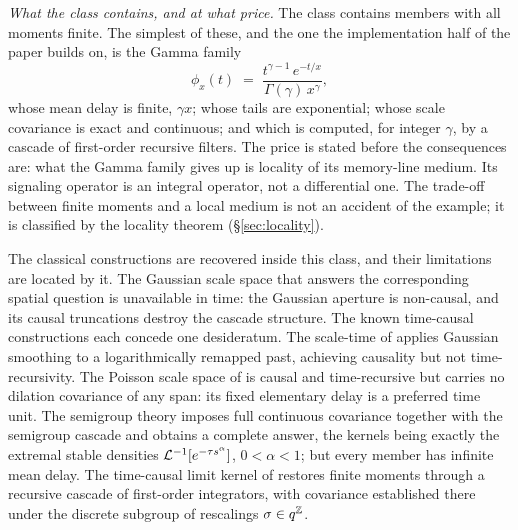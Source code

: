 \emph{What the class contains, and at what price.} The class contains members with all
moments finite. The simplest of these, and the one the implementation half of the paper
builds on, is the Gamma family
\[
  \phi_x(t) \;=\; \frac{t^{\gamma-1}\,e^{-t/x}}{\Gamma(\gamma)\,x^{\gamma}},
\]
whose mean delay is finite, $\gamma x$; whose tails are exponential; whose scale covariance
is exact and continuous; and which is computed, for integer $\gamma$, by a cascade of
first-order recursive filters. The price is stated before the consequences are: what the
Gamma family gives up is locality of its memory-line medium. Its signaling operator is
an integral operator, not a differential one. The trade-off between finite moments
and a local medium is not an accident of the example; it is classified by the locality
theorem (\S\ref{sec:locality}).

The classical constructions are recovered inside this class, and their limitations are
located by it. The Gaussian scale space that answers the corresponding spatial question
 is unavailable in time: the Gaussian
aperture is non-causal, and its causal truncations destroy the cascade structure. The
known time-causal constructions each concede one desideratum. The scale-time of
 applies Gaussian smoothing to a logarithmically remapped past,
achieving causality but not time-recursivity. The Poisson scale space of
 is causal and time-recursive but carries no dilation covariance
of any span: its fixed elementary delay is a preferred time unit. The semigroup theory
imposes full
continuous covariance together with the semigroup cascade and obtains a complete answer,
the kernels being exactly the extremal stable densities $\mathcal{L}^{-1}[e^{-\tau s^\alpha}]$,
$0 < \alpha < 1$; but every member has infinite mean delay. The time-causal limit kernel of
 restores
finite moments through a recursive cascade of first-order integrators, with covariance
established there under the discrete subgroup of rescalings $\sigma \in q^{\mathbb{Z}}$.

